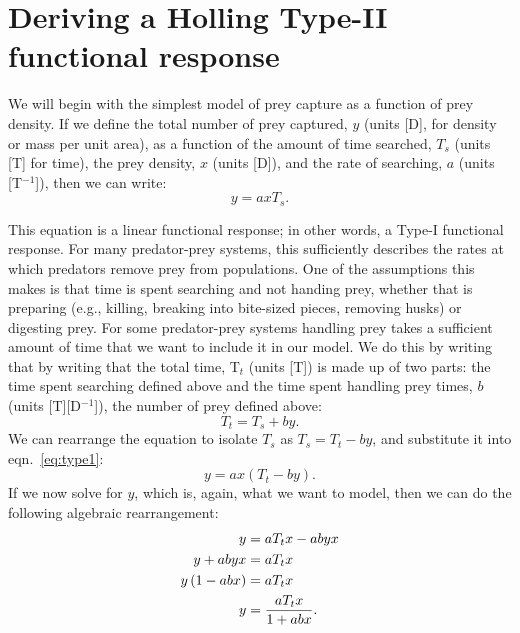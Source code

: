 \documentclass[11pt]{article}
\begin{document}
\section{Deriving a Holling Type-II functional response}

We will begin with the simplest model of prey capture as a function of prey density. If we define the total number of prey captured, $y$ (units [D], for density or mass per unit area), as a function of the amount of time searched, $T_s$ (units [T] for time), the prey density, $x$ (units [D]), and the rate of searching, $a$ (units [T$^{-1}$]), then we can write:
    \begin{equation}
    y = axT_s. \label{eq:type1}
    \end{equation}

This equation is a linear functional response; in other words, a Type-I functional response. For many predator-prey systems, this sufficiently describes the rates at which predators remove prey from populations. One of the assumptions this makes is that time is  spent searching and not handing prey, whether that is preparing (e.g., killing, breaking into bite-sized pieces, removing husks) or digesting prey. For some predator-prey systems handling prey takes a sufficient amount of time that we want to include it in our model. We do this by writing that by writing that the total time, T$_t$ (units [T]) is made up of two parts: the time spent searching defined above and the time spent handling prey times, $b$ (units [T][D$^{-1}$]), the number of prey defined above:
    \begin{equation}
    T_t = T_s + by.
    \end{equation}
We can rearrange the equation to isolate $T_s$ as $ T_s =  T_t - by$, and substitute it into eqn.~\ref{eq:type1}:
    \begin{equation}
    y = ax\left(T_t - by\right).
    \end{equation}
If we now solve for $y$, which is, again, what we want to model, then we can do the following algebraic rearrangement:
\begin{equation}
\begin{subequations}
\begin{aligned}
    y &= aT_tx - abyx \\
    y + abyx &= aT_tx \\
    y\left(1 - abx\right) &= aT_tx \\
     y &= \frac{aT_tx}{1 + abx}. \label{eq:type2}
\end{aligned}
\end{subequations}
\end{equation}
\end{document}
